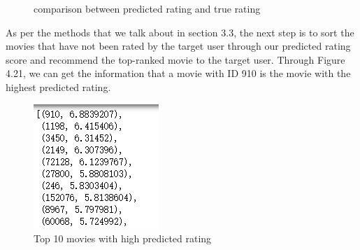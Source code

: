 \begin{figure}[htbp]
\centering
{}%
%
\centering
\caption{comparison between predicted rating and true rating }
\end{figure} 

As per the methods that we talk about in section 3.3, the next step is to sort the movies that have not been rated by the target user through our predicted rating score and recommend the top-ranked movie to the target user. Through Figure 4.21, we can get the information that a movie with ID 910 is the movie with the highest predicted rating. 
\begin{figure}[htbp]
\centering
\includegraphics[scale =1]{figure/h2.png}
\caption{Top 10 movies with high predicted rating}
\end{figure}

